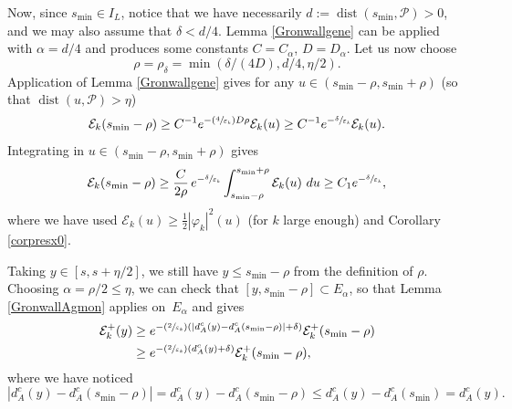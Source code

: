 \documentclass[JEP,XML,SOM,Unicode]{cedram}
\newcommand{\Psfrac}[2]{(\sfrac{#1}{#2})}
\theoremstyle{definition}
\newcommand{\Ek}{\mathcal{E}_k}
\DeclareMathOperator{\dist}{dist}
\newcommand{\ce}{c}
\let\e\varepsilon
\begin{document}
Now, since $s_{\min} \in I_L$, notice that we have necessarily $d:=\dist(s_{\min},\mathcal{P})>0$, and we may also assume that $\delta<d/4$.
Lemma \ref{Gronwallgene} can be applied with $\alpha=d/4$ and produces some constants $C=C_{\alpha}$, $D=D_{\alpha}$. Let us now choose
\[
\rho=\rho_{\delta}=\min(\delta/(4D),d/4, \eta/2).
\]
Application of Lemma \ref{Gronwallgene} gives for any $u\in (s_{\min}-\rho,s_{\min}+\rho) $ (so that $\dist(u,\mathcal{P})>\eta$)
\[
\Ek(s_{\min}-\rho)\geq C^{-1}e^{-\Psfrac{4}{\e_k}D\rho}\Ek(u)\geq C^{-1}e^{-\sfrac{\delta}{\e_k}}\Ek(u).
\]
Integrating in $u\in (s_{\min}-\rho,s_{\min}+\rho) $ gives
\begin{equation}
\label{inegEk}
\Ek(s_{\min}-\rho)\geq \frac{C}{2\rho}\,e^{-\sfrac{\delta}{\e_k}}\int_{s_{\min}-\rho}^{s_{\min}+\rho} \Ek(u)~du \geq C_1e^{-\sfrac{\delta}{\e_k}},
\end{equation}
where we have used $\Ek(u)\geq \frac12 |\varphi_k|^2(u)$ (for $k$ large enough) and Corollary \ref{corpresx0}.

Taking $y\in [s,s+\eta/2]$, we still have $y\leq s_{\min}-\rho$ from the definition of $\rho$. Choosing $\alpha=\rho/2\leq \eta$, we can check that $[y,s_{\min}-\rho]\subset E_{\alpha}$, so that Lemma \ref{GronwallAgmon} applies on~$E_{\alpha}$ and gives
\begin{equation}
\label{inegdaeta}
\begin{split}
\Ek^+(y)&\geq e^{ -\Psfrac{2}{\e_k}\left(|d_A^{\ce}(y)-d_A^{\ce}(s_{\min}-\rho)|+\delta\right)}\Ek^+(s_{\min}-\rho)\\
&\geq e^{-\Psfrac{2}{\e_k}\left(d_A^{\ce}(y)+\delta\right)}\Ek^+(s_{\min}-\rho),
\end{split}
\end{equation}
where we have noticed
\[
|d_A^{\ce}(y)-d_A^{\ce}(s_{\min}-\rho)|= d_A^{\ce}(y)-d_A^{\ce}(s_{\min}-\rho) \leq d_A^{\ce}(y)-d_A^{\ce}(s_{\min}) = d_A^{\ce}(y).
\]
\end{document}
